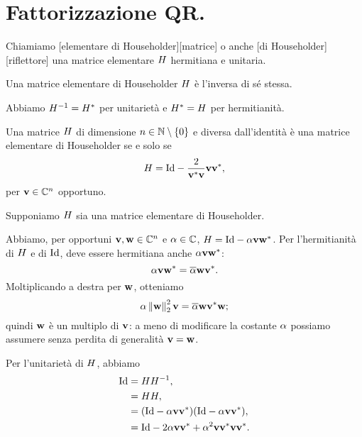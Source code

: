\section{Fattorizzazione QR.}
\label{MetodiNumericiPerLaRisoluzioneDiSistemiLineari_FattorizzazioneQR}
\begin{Definition}
  Chiamiamo
  [elementare di Householder][matrice]
  o anche
  [di Householder][riflettore]
  una matrice elementare $H$ hermitiana e unitaria.
\end{Definition}
\begin{Theorem}
  Una matrice elementare di Householder $H$ \`e
  l'inversa di s\'e stessa.
\end{Theorem}
\Proof Abbiamo
$H^{-1}
= {H}^*$
per unitariet\`a e
${H}^*
= H$
per hermitianit\`a. \EndProof
\begin{Theorem}
  Una matrice $H$ di dimensione
  $n \in \mathbb{N} \setminus \lbrace 0 \rbrace$ e diversa dall'identit\`a \`e una matrice elementare di
  Householder se e solo se
  \[
    \HouseholderElementaryMatrix
    = \Identity
    - \frac{2}{\HermitianTransposed{\Vector}\Vector}
    \Vector\HermitianTransposed{\Vector},
  \]
  per $\mathbf{v} \in \mathbb{C}^n$ opportuno.
\end{Theorem}
\Proof Supponiamo $H$ sia una matrice elementare di Householder.
\par Abbiamo, per opportuni $\mathbf{v}, \mathbf{w} \in \mathbb{C}^n$ e $\alpha \in \mathbb{C}$,
$\HouseholderElementaryMatrix = \Identity - \Scalar\Vector\HermitianTransposed{\VarVector}$.
Per l'hermitianit\`a di $H$ e di $\Identity$, deve essere
hermitiana anche $\alpha\mathbf{v}{\mathbf{w}}^*$:
\[
  \alpha\mathbf{v}{\mathbf{w}}^*
  = \overline{\alpha}\mathbf{w}{\mathbf{v}}^*.
\]
Moltiplicando a destra per $\mathbf{w}$, otteniamo
\[
  \Scalar\Norm{\VarVector}_2^2\Vector
  = \Conjugate{\Scalar}\VarVector\HermitianTransposed{\Vector}\VarVector;
\]
quindi $\mathbf{w}$ \`e un multiplo di $\mathbf{v}$: a meno di modificare la costante
$\alpha$ possiamo assumere senza perdita di generalit\`a $\mathbf{v} = \mathbf{w}$.
\par Per l'unitariet\`a di $H$, abbiamo
\begin{align*}
  \Identity
  &= \HouseholderElementaryMatrix\HouseholderElementaryMatrix^{-1},\\
  &= \HouseholderElementaryMatrix\HouseholderElementaryMatrix,\\
  &= (\Identity - \Scalar\Vector\HermitianTransposed{\Vector})
      (\Identity - \Scalar\Vector\HermitianTransposed{\Vector}),\\
  &= \Identity
      - 2 \Scalar\Vector\HermitianTransposed{\Vector}
      + \Scalar^2\Vector\HermitianTransposed{\Vector}\Vector\HermitianTransposed{\Vector}.
\end{align*}

